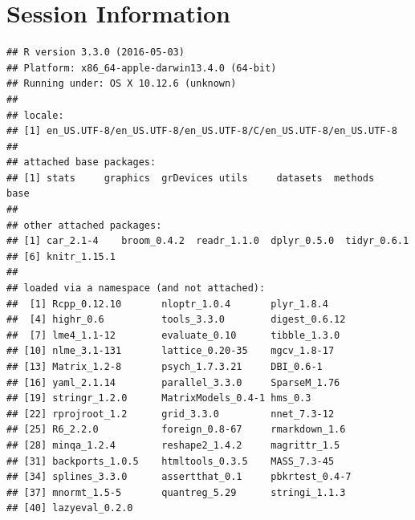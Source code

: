 \documentclass[]{article}
\begin{document}
\section{Session Information}\label{session-information}

\begin{verbatim}
## R version 3.3.0 (2016-05-03)
## Platform: x86_64-apple-darwin13.4.0 (64-bit)
## Running under: OS X 10.12.6 (unknown)
## 
## locale:
## [1] en_US.UTF-8/en_US.UTF-8/en_US.UTF-8/C/en_US.UTF-8/en_US.UTF-8
## 
## attached base packages:
## [1] stats     graphics  grDevices utils     datasets  methods   base     
## 
## other attached packages:
## [1] car_2.1-4    broom_0.4.2  readr_1.1.0  dplyr_0.5.0  tidyr_0.6.1 
## [6] knitr_1.15.1
## 
## loaded via a namespace (and not attached):
##  [1] Rcpp_0.12.10       nloptr_1.0.4       plyr_1.8.4        
##  [4] highr_0.6          tools_3.3.0        digest_0.6.12     
##  [7] lme4_1.1-12        evaluate_0.10      tibble_1.3.0      
## [10] nlme_3.1-131       lattice_0.20-35    mgcv_1.8-17       
## [13] Matrix_1.2-8       psych_1.7.3.21     DBI_0.6-1         
## [16] yaml_2.1.14        parallel_3.3.0     SparseM_1.76      
## [19] stringr_1.2.0      MatrixModels_0.4-1 hms_0.3           
## [22] rprojroot_1.2      grid_3.3.0         nnet_7.3-12       
## [25] R6_2.2.0           foreign_0.8-67     rmarkdown_1.6     
## [28] minqa_1.2.4        reshape2_1.4.2     magrittr_1.5      
## [31] backports_1.0.5    htmltools_0.3.5    MASS_7.3-45       
## [34] splines_3.3.0      assertthat_0.1     pbkrtest_0.4-7    
## [37] mnormt_1.5-5       quantreg_5.29      stringi_1.1.3     
## [40] lazyeval_0.2.0
\end{verbatim}
\end{document}
